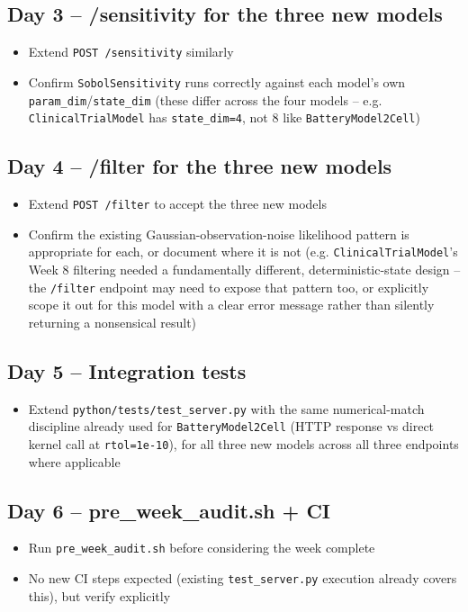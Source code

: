 \documentclass[11pt]{article}
\begin{document}
\subsection*{Day 3 -- /sensitivity for the three new models}
\begin{itemize}[leftmargin=*]
  \item Extend \texttt{POST /sensitivity} similarly
  \item Confirm \texttt{SobolSensitivity} runs correctly against each
    model's own \texttt{param\_dim}/\texttt{state\_dim} (these differ
    across the four models -- e.g. \texttt{ClinicalTrialModel} has
    \texttt{state\_dim=4}, not 8 like \texttt{BatteryModel2Cell})
\end{itemize}

\subsection*{Day 4 -- /filter for the three new models}
\begin{itemize}[leftmargin=*]
  \item Extend \texttt{POST /filter} to accept the three new models
  \item Confirm the existing Gaussian-observation-noise likelihood
    pattern is appropriate for each, or document where it is not
    (e.g. \texttt{ClinicalTrialModel}'s Week 8 filtering needed a
    fundamentally different, deterministic-state design -- the
    \texttt{/filter} endpoint may need to expose that pattern too, or
    explicitly scope it out for this model with a clear error message
    rather than silently returning a nonsensical result)
\end{itemize}

\subsection*{Day 5 -- Integration tests}
\begin{itemize}[leftmargin=*]
  \item Extend \texttt{python/tests/test\_server.py} with the same
    numerical-match discipline already used for
    \texttt{BatteryModel2Cell} (HTTP response vs direct kernel call at
    \texttt{rtol=1e-10}), for all three new models across all three
    endpoints where applicable
\end{itemize}

\subsection*{Day 6 -- pre\_week\_audit.sh + CI}
\begin{itemize}[leftmargin=*]
  \item Run \texttt{pre\_week\_audit.sh} before considering the week
    complete
  \item No new CI steps expected (existing \texttt{test\_server.py}
    execution already covers this), but verify explicitly
\end{itemize}
\end{document}
